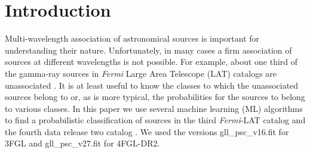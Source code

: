 \documentclass{aa}
\newcommand{\Fermi}{\textit{Fermi}\xspace}
\begin{document}

\maketitle



\section{Introduction}

Multi-wavelength association of astronomical sources is important for understanding their nature.
Unfortunately, in many cases a firm association of sources at different wavelengths is not possible.
For example, about one third of the gamma-ray sources in \Fermi Large Area Telescope (LAT) catalogs are unassociated
\citep{2010ApJS..188..405A, 2012ApJS..199...31N, 2015ApJS..218...23A, 2020ApJS..247...33A}.
It is at least useful to know the classes to which the unassociated sources belong to or, as is more typical,
the probabilities for the sources to belong to various classes.
In this paper we use several machine learning (ML) algorithms to find a probabilistic classification of
 sources in the third \Fermi-LAT catalog \citep[3FGL,][]{2015ApJS..218...23A} and the fourth data release two catalog
\citep[4FGL-DR2,][]{2020ApJS..247...33A, 2020arXiv200511208B}. We used the versions gll\_psc\_v16.fit for 3FGL
and gll\_psc\_v27.fit for 4FGL-DR2.
\end{document}
